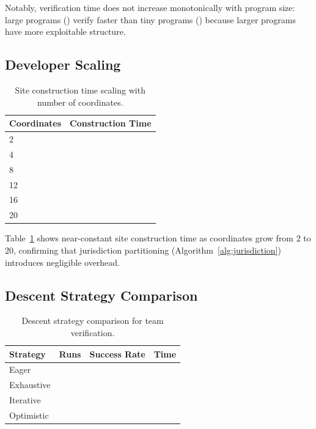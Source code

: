 \documentclass[11pt]{article}
\begin{document}
Notably, verification time does not increase monotonically with program size:
large programs (\compLargeMeanTime{}) verify faster than tiny programs
(\compTinyMeanTime{}) because larger programs have more exploitable structure.

\subsection{Developer Scaling}

\begin{table}[t]
\centering
\caption{Site construction time scaling with number of coordinates.}
\label{tab:dev-scaling}
\begin{tabular}{lr}
\toprule
\textbf{Coordinates} & \textbf{Construction Time} \\
\midrule
2  & \subScaleTwoTime{} \\
4  & \subScaleFourTime{} \\
8  & \subScaleEightTime{} \\
12 & \subScaleTwelveTime{} \\
16 & \subScaleSixteenTime{} \\
20 & \subScaleTwentyTime{} \\
\bottomrule
\end{tabular}
\end{table}

Table~\ref{tab:dev-scaling} shows near-constant site construction time as
coordinates grow from 2 to 20, confirming that jurisdiction partitioning
(Algorithm~\ref{alg:jurisdiction}) introduces negligible overhead.

\subsection{Descent Strategy Comparison}

\begin{table}[t]
\centering
\caption{Descent strategy comparison for team verification.}
\label{tab:descent-comparison}
\begin{tabular}{lrrr}
\toprule
\textbf{Strategy} & \textbf{Runs} & \textbf{Success Rate} & \textbf{Time} \\
\midrule
Eager       & \compDescentEagerRuns{} & \compDescentEagerRate{}
            & \subDescentEagerTime{} \\
Exhaustive  & \compDescentExhaustiveRuns{} & \compDescentExhaustiveRate{}
            & \subDescentExhaustiveTime{} \\
Iterative   & \compDescentIterativeRuns{} & \compDescentIterativeRate{}
            & \subDescentIterativeTime{} \\
Optimistic  & \compDescentOptimisticRuns{} & \compDescentOptimisticRate{}
            & \subDescentOptimisticTime{} \\
\bottomrule
\end{tabular}
\end{table}
\end{document}
